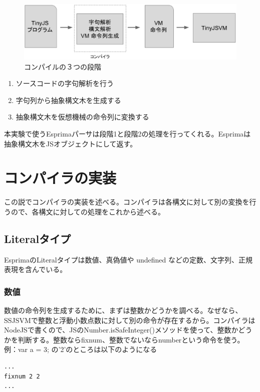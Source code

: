 \documentclass[12pt]{article}
\begin{document}
\begin{figure}
\centering
\includegraphics[scale=0.5]{process.eps}
\caption{コンパイルの３つの段階}
\end{figure}
\FloatBarrier

\begin{enumerate}
\item ソースコードの字句解析を行う
\item 字句列から抽象構文木を生成する
\item 抽象構文木を仮想機械の命令列に変換する
\end{enumerate}

本実験で使うEsprimaパーサは段階1と段階2の処理を行ってくれる。Esprimaは抽象構文木をJSオブジェクトにして返す。

\section{コンパイラの実装}
この説でコンパイラの実装を述べる。コンパイラは各構文に対して別の変換を行うので、各構文に対しての処理をこれから述べる。

\subsection{Literalタイプ}
EsprimaのLiteralタイプは数値、真偽値や undefined などの定数、文字列、正規表現を含んでいる。

\subsubsection{数値}
数値の命令列を生成するために、まずは整数かどうかを調べる。なぜなら、SSJSVMで整数と浮動小数点数に対して別の命令が存在するから。コンパイラはNodeJSで書くので、JSのNumber.isSafeInteger()メソッドを使って、整数かどうかを判断する。整数ならfixnum、整数でないならnumberという命令を使う。\\

例：var a = 3; の'2'のところは以下のようになる
\begin{lstlisting}
...
fixnum 2 2
...
\end{lstlisting}
\FloatBarrier
\end{document}
